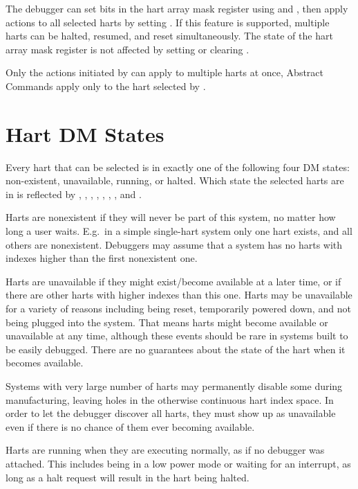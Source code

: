 The debugger can set bits in the hart array mask register using \RdmHawindowsel
and \RdmHawindow, then apply actions to all selected harts by setting \FdmDmcontrolHasel. If
this feature is supported, multiple harts can be halted, resumed, and reset
simultaneously. The state of the hart array mask register is not affected by
setting or clearing \FdmDmcontrolHasel.

Only the actions initiated by \RdmDmcontrol can apply to multiple harts
at once, Abstract Commands apply only to the hart selected by
\Fhartsel.

\section{Hart DM States}

Every hart that can be selected is in exactly one of the following four DM states:
non-existent, unavailable, running, or halted. Which state
the selected harts are in is reflected by \FdmDmstatusAllnonexistent,
\FdmDmstatusAnynonexistent, \FdmDmstatusAllunavail, \FdmDmstatusAnyunavail,
\FdmDmstatusAllrunning, \FdmDmstatusAnyrunning, \FdmDmstatusAllhalted, and
\FdmDmstatusAnyhalted.

Harts are nonexistent if they will never be part of this system, no matter how
long a user waits. E.g.\ in a simple single-hart system only one hart exists,
and all others are nonexistent. Debuggers may assume that a system has no harts
with indexes higher than the first nonexistent one.

Harts are unavailable if they might exist/become available at a later time, or
if there are other harts with higher indexes than this one. Harts may be
unavailable for a variety of reasons including being reset, temporarily powered
down, and not being plugged into the system. That means harts might become
available or unavailable at any time, although these events should be rare
in systems built to be easily debugged.
There are no guarantees about the state of the hart when it becomes available.

Systems with very large number of harts may
permanently disable some during manufacturing, leaving holes in the otherwise
continuous hart index space. In order to let the debugger discover all harts,
they must show up as unavailable even if there is no chance of them ever
becoming available.


Harts are running when they are executing normally, as if no debugger was
attached. This includes being in a low power mode or waiting for an interrupt,
as long as a halt request will result in the hart being halted.


